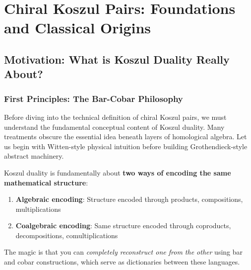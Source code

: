 
\chapter{Chiral Koszul Pairs: Foundations and Classical Origins}

\section{Motivation: What is Koszul Duality Really About?}

\subsection{First Principles: The Bar-Cobar Philosophy}

Before diving into the technical definition of chiral Koszul pairs, we must understand the fundamental conceptual content of Koszul duality. Many treatments obscure the essential idea beneath layers of homological algebra. Let us begin with Witten-style physical intuition before building Grothendieck-style abstract machinery.

\begin{principle}
Koszul duality is fundamentally about \textbf{two ways of encoding the same mathematical structure}:
\begin{enumerate}
\item \textbf{Algebraic encoding}: Structure encoded through products, compositions, multiplications
\item \textbf{Coalgebraic encoding}: Same structure encoded through coproducts, decompositions, comultiplications
\end{enumerate}

The magic is that you can \emph{completely reconstruct one from the other} using bar and cobar constructions, which serve as dictionaries between these languages.
\end{principle}

